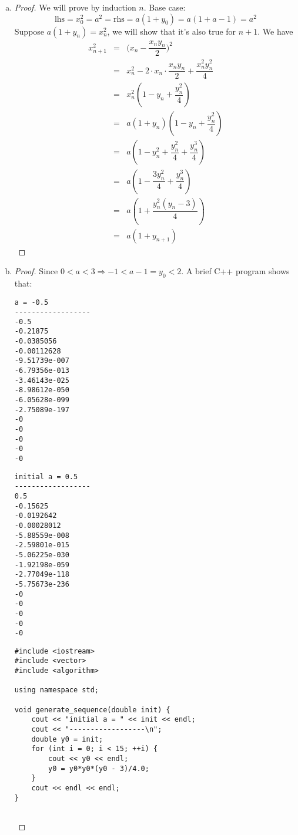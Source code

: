 \documentclass[10pt,letterpaper]{article}
\begin{document}
	\begin{enumerate}[(a)]
		\item
		\begin{proof} 
		We will prove by induction $n$. Base case:
		$$\text{lhs} = x_0^2 = a^2 = \text{rhs} = a(1 + y_0) = a(1 + a - 1) = a^2$$
		Suppose $a(1 + y_n) = x_n^2$, we will show that it's also true for $n + 1$.
		We have
		\begin{eqnarray*}
		x^2_{n+1} &=& \bigg(x_n - \dfrac{x_ny_n}{2}\bigg)^2 \\
			    &=& x_n^2 - 2\cdot x_n \cdot \dfrac{x_ny_n}{2} + \dfrac{x_n^2y_n^2}{4} \\
		&=& x_n^2(1 - y_n + \dfrac{y_n^2}{4}) \\
		&=& a(1 + y_n)(1 - y_n + \dfrac{y_n^2}{4}) \\
		&=& a(1 - y_n^2 + \dfrac{y_n^2}{4} + \dfrac{y_n^3}{4}) \\
		&=& a(1 - \dfrac{3y_n^2}{4} + \dfrac{y_n^3}{4}) \\
		&=& a(1 + \dfrac{y_n^2(y_n - 3)}{4}) \\
		&=& a(1 + y_{n+1})  
		\end{eqnarray*}
		
		\end{proof}
		\item
		\begin{proof} 
		Since $0 < a < 3 \Rightarrow -1 < a - 1 = y_0 < 2$. A brief C++ program shows that:
\begin{verbatim}
a = -0.5
------------------	
-0.5
-0.21875
-0.0385056
-0.00112628
-9.51739e-007
-6.79356e-013
-3.46143e-025
-8.98612e-050
-6.05628e-099
-2.75089e-197
-0
-0
-0
-0
-0
\end{verbatim}
\begin{verbatim}
initial a = 0.5
------------------
0.5
-0.15625
-0.0192642
-0.00028012
-5.88559e-008
-2.59801e-015
-5.06225e-030
-1.92198e-059
-2.77049e-118
-5.75673e-236
-0
-0
-0
-0
-0
\end{verbatim}
\begin{verbatim}
#include <iostream>
#include <vector>
#include <algorithm>

using namespace std;

void generate_sequence(double init) {
	cout << "initial a = " << init << endl;
	cout << "------------------\n";
	double y0 = init;
	for (int i = 0; i < 15; ++i) {
		cout << y0 << endl;
		y0 = y0*y0*(y0 - 3)/4.0;
	}
	cout << endl << endl;
}


\end{verbatim}
\end{proof}
\end{enumerate}
\end{document}
